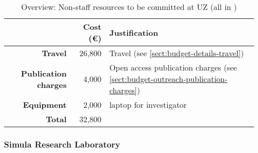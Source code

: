 \bigskip
\begin{table}[H]
\begin{tabular}{|r|r|p{9cm}|}
\hline
\textbf{} & \textbf{Cost (\euro)} & \textbf{Justification} \\\hline
\textbf{Travel} & 26,800 & Travel (see \ref{sect:budget-details-travel})\\\hline
\textbf{Publication charges} & 4,000 & Open access publication charges (see \ref{sect:budget-outreach-publication-charges})\\\hline
\textbf{Equipment} & 2,000 &  laptop for investigator \\\hline    %

\textbf{Total} & 32,800\\\cline{1-2}
\end{tabular}
\caption{Overview: Non-staff resources to be committed at UZ (all in \texteuro)}\vspace*{-1em}
\end{table}




\subsubsection{Simula Research Laboratory}


